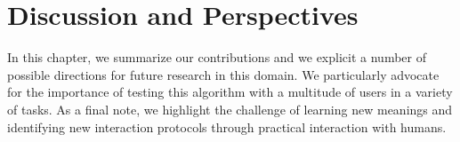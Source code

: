 
\chapter{Discussion and Perspectives}
\label{chapter:conclusion}
\minitoc



In this chapter, we summarize our contributions and we explicit a number of possible directions for future research in this domain. We particularly advocate for the importance of testing this algorithm with a multitude of users in a variety of tasks. As a final note, we highlight the challenge of learning new meanings and identifying new interaction protocols through practical interaction with humans.



